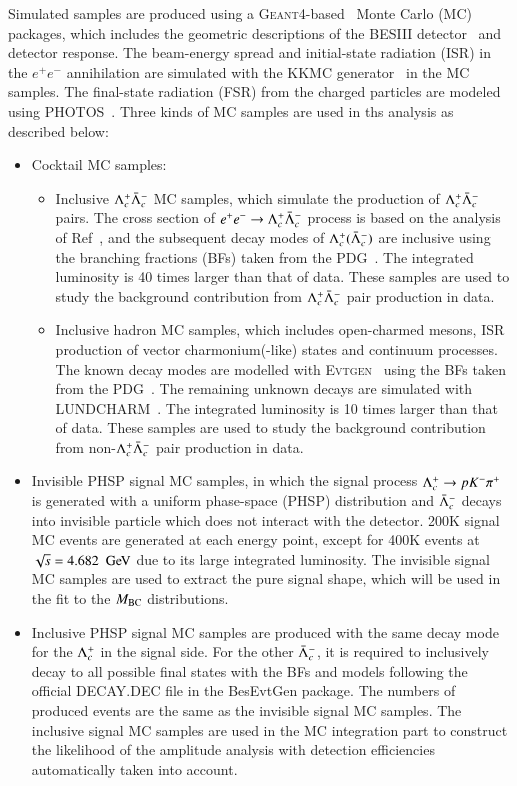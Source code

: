 Simulated samples are produced using a \textsc{Geant4}-based~\cite{GEANT4:2002zbu} Monte Carlo (MC) packages, which includes the geometric descriptions of the BESIII detector~\cite{Liang:2009zzb,Huang:2022wuo} and detector response. The beam-energy spread and initial-state radiation (ISR) in the $e^+e^-$ annihilation are simulated with the \textsc{KKMC} generator~\cite{Jadach:2000ir} in the MC samples. The final-state radiation (FSR) from the charged particles are modeled using \textsc{PHOTOS}~\cite{Richter-Was:1992hxq}. Three kinds of MC samples are used in ths analysis as described below:
\begin{itemize}
    \item Cocktail MC samples:
    \begin{itemize}
        \item Inclusive $\Lambda_{c}^{+}\bar{\Lambda}_{c}^{-}$ MC samples, which simulate the production of $\Lambda_{c}^{+}\bar{\Lambda}_{c}^{-}$ pairs. The cross section of $e^+e^- \rightarrow \Lambda_{c}^{+}\bar{\Lambda}_{c}^{-}$ process is based on the analysis of Ref~\cite{Wang:memo}, and the subsequent decay modes of $\Lambda_{c}^{+}(\bar{\Lambda}_{c}^{-})$ are inclusive using the branching fractions (BFs) taken from the PDG~\cite{Workman:2022ynf}. The integrated luminosity is 40 times larger than that of data. These samples are used to study the background contribution from $\Lambda_{c}^{+}\bar{\Lambda}_{c}^{-}$ pair production in data. 
        \item Inclusive hadron MC samples, which includes open-charmed mesons, ISR production of vector charmonium(-like) states and continuum processes. The known decay modes are modelled with \textsc{Evtgen}~\cite{Lange:2001uf,Ping:2008zz} using the BFs taken from the PDG~\cite{Workman:2022ynf}. The remaining unknown decays are simulated with \textsc{LUNDCHARM}~\cite{Chen:2000tv,Yang:2014vra}. The integrated luminosity is 10 times larger than that of data. These samples are used to study the background contribution from non-$\Lambda_{c}^{+}\bar{\Lambda}_{c}^{-}$ pair production in data. 
    \end{itemize}
    \item Invisible PHSP signal MC samples, in which the signal process $\Lambda_{c}^{+} \rightarrow pK^-\pi^+$ is generated with a uniform phase-space (PHSP) distribution and $\bar{\Lambda}_{c}^{-}$ decays into invisible particle which does not interact with the detector. 200K signal MC events are generated at each energy point, except for 400K events at $\sqrt{s} = 4.682~\gev$ due to its large integrated luminosity. The invisible signal MC samples are used to extract the pure signal shape, which will be used in the fit to the $M_{\rm{BC}}$ distributions.
    \item Inclusive PHSP signal MC samples are produced with the same decay mode for the $\Lambda_{c}^{+}$ in the signal side. For the other $\bar{\Lambda}_{c}^{-}$, it is required to inclusively decay to all possible final states with the BFs and models following the official DECAY.DEC file in the BesEvtGen package. The numbers of produced events are the same as the invisible signal MC samples. The inclusive signal MC samples are used in the MC integration part to construct the likelihood of the amplitude analysis with detection efficiencies automatically taken into account. 
\end{itemize}
